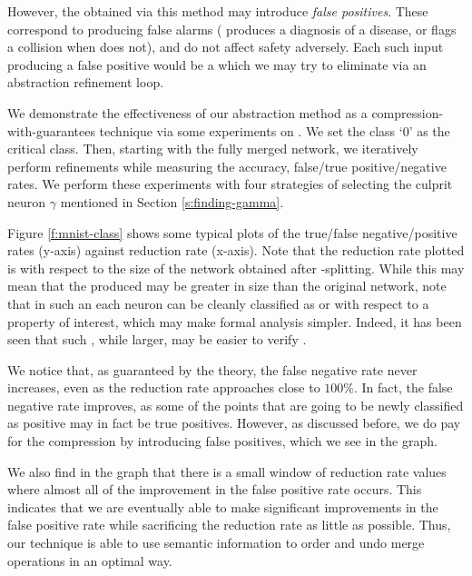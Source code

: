 However, the \abs obtained via this method may introduce
\emph{false positives}. These correspond to producing false alarms (\abs
produces a diagnosis of a disease, or flags a collision when \cnc does not), and
do not affect safety adversely. Each such input producing a false positive
would be a \gencex which we may try to eliminate via an abstraction refinement
loop.

We demonstrate the effectiveness of our abstraction method as a
compression-with-guarantees technique via some experiments on \mnist. We set the
class `0' as the critical class. Then, starting with the fully merged network,
we iteratively perform refinements while measuring the accuracy, false/true
positive/negative rates. We perform these experiments with four strategies of
selecting the culprit neuron $\gamma$ mentioned in Section
\ref{s:finding-gamma}.

Figure \ref{f:mnist-class} shows some typical plots of the true/false
negative/positive rates (y-axis) against reduction rate (x-axis). Note that the
reduction rate plotted is with respect to the size of the network obtained after
\inc-\dec splitting. While this may mean that the \abs produced may be greater
in size than the original network, note that in such an \abs each neuron can be
cleanly classified as \inc or \dec with respect to a property of interest, which
may make formal analysis simpler. Indeed, it has been seen that such \abs, while
larger, may be easier to verify \cite{cegar-nn}. 

We notice that, as guaranteed by the theory, the false negative rate never
increases, even as the reduction rate approaches close to $100\%$. In fact, the
false negative rate improves, as some of the points that are going
to be newly classified as positive may in fact be true positives.  
However, as discussed before, we do pay for the compression by introducing false
positives, which we see in the graph. 

We also find in the graph that there is a
small window of reduction rate values where almost all of the improvement in the
false positive rate occurs. This indicates that we are eventually able to make 
significant improvements in the false positive rate while sacrificing the
reduction rate as little as possible. Thus, our technique is able to use
semantic information to order and undo merge operations in an optimal way.

